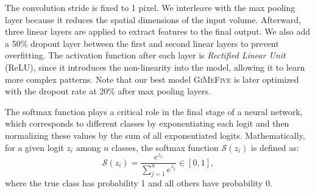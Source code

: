 The convolution stride is fixed to 1 pixel. 
We interleave with the max pooling layer because it reduces the spatial dimensions of the input volume. 
Afterward, three linear layers are applied to extract features to the final output. 
We also add a 50\% dropout layer between the first and second linear layers to prevent overfitting. 
The activation function after each layer is \textit{Rectified Linear Unit} (ReLU), 
since it introduces the non-linearity into the model, 
allowing it to learn more complex patterns. 
Note that our best model \textsc{GiMeFive} is later optimized with the dropout rate at 20\% after max pooling layers. 

The softmax function plays a critical role in the final stage of a neural network, 
which corresponds to different classes by exponentiating each logit and then normalizing these values by the sum of all exponentiated logits. 
Mathematically, for a given logit $z_i$ among $n$ classes, 
the softmax function $\mathcal{S}(z_i)$ is defined as: 
\begin{equation}
  \mathcal{S}(z_i) = \frac{e^{z_i}}{\sum_{j=1}^{n} e^{z_j}} \in [0,1], 
\end{equation}
where the true class has probability 1 and all others have probability 0. 

